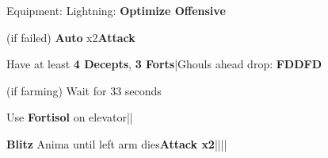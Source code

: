 \begin{menu}
	\item Equipment: Lightning: \textbf{Optimize Offensive}
\end{menu}

\begin{mainlist}
	\item {} (if failed) \textbf{Auto} x2\to\textbf{Attack}
	\item Have at least \textbf{4 Decepts}, \textbf{3 Forts}|Ghouls ahead drop: \textbf{FDDFD}
	\item {} (if farming) Wait for 33 seconds
	\item Use \textbf{Fortisol} on elevator||\skip
	\item {} \textbf{Blitz} Anima until left arm dies\to\textbf{Attack x2}||\save||\save
\end{mainlist}
